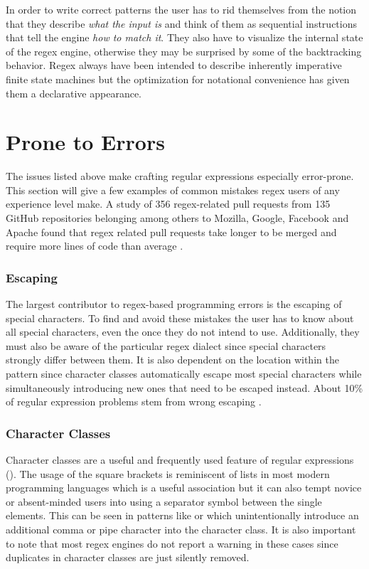 In order to write correct patterns the user has to rid themselves from the notion that they describe \emph{what the input is} and think of them as sequential instructions that tell the engine \emph{how to match it}. They also have to visualize the internal state of the regex engine, otherwise they may be surprised by some of the backtracking behavior. Regex always have been intended to describe inherently imperative finite state machines but the optimization for notational convenience has given them a declarative appearance.

\section{Prone to Errors}

The issues listed above make crafting regular expressions especially error-prone. This section will give a few examples of common mistakes regex users of any experience level make. A study of 356 regex-related pull requests from 135 GitHub repositories belonging among others to Mozilla, Google, Facebook and Apache found that regex related pull requests take longer to be merged and require more lines of code than average \cite{DemystifyingRegexBugs}.

\subsubsection{Escaping}

The largest contributor to regex-based programming errors is the escaping of special characters. To find and avoid these mistakes the user has to know about all special characters, even the once they do not intend to use. Additionally, they must also be aware of the particular regex dialect since special characters strongly differ between them. It is also dependent on the location within the pattern since character classes automatically escape most special characters while simultaneously introducing new ones that need to be escaped instead. About 10\% of regular expression problems stem from wrong escaping \cite{DemystifyingRegexBugs}. 

\subsubsection{Character Classes}

Character classes are a useful and frequently used feature of regular expressions (). The usage of the square brackets is reminiscent of lists in most modern programming languages which is a useful association but it can also tempt novice or absent-minded users into using a separator symbol between the single elements. This can be seen in patterns like \pattern{[0,2,3,5-9]} \cite{RegexErrorNlpChinaCharClassSep} or \pattern{[3|4|5|7|8]} \cite{RegexErrorRoncooCharClassSep} which unintentionally introduce an additional comma or pipe character into the character class. It is also important to note that most regex engines do not report a warning in these cases since duplicates in character classes are just silently removed.


